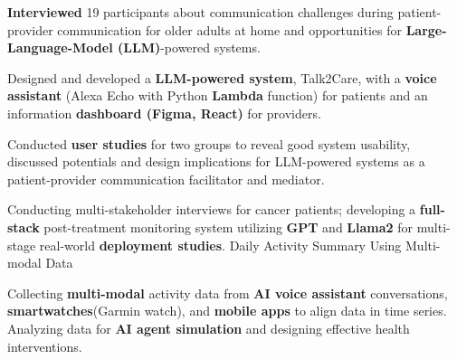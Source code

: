          \item \textbf{Interviewed} 19 participants about communication challenges during patient-provider communication for older adults at home and opportunities for \textbf{Large-Language-Model (LLM)}-powered systems.
        \item Designed and developed a \textbf{LLM-powered system}, Talk2Care,  with a \textbf{voice assistant} (Alexa Echo with Python \textbf{Lambda} function) for patients and an information \textbf{dashboard (Figma, React)} for providers.
        \item Conducted \textbf{user studies} for two groups to reveal good system usability, discussed potentials and design implications for LLM-powered systems as a patient-provider communication facilitator and mediator. 
        \item Conducting multi-stakeholder interviews for cancer patients; developing a \textbf{full-stack} post-treatment monitoring system utilizing \textbf{GPT} and \textbf{Llama2} for multi-stage real-world \textbf{deployment studies}.
      \resumeItemListEnd
            \vspace{-1mm}
      Daily Activity Summary Using Multi-modal Data
      \vspace{-3mm}
      \resumeItemListStart
         \item Collecting \textbf{multi-modal} activity data from \textbf{AI voice assistant} conversations, \textbf{smartwatches}(Garmin watch), and \textbf{mobile apps} to align data in time series. Analyzing data for \textbf{AI agent simulation} and designing effective health interventions.
      \resumeItemListEnd
      \vspace{-2mm}

